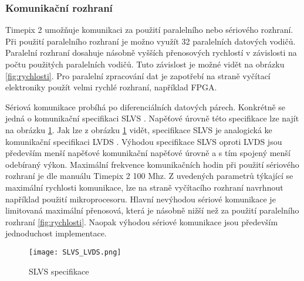 \subsubsection{Komunikační rozhraní}
\label{Komunikacni rozhrani}
Timepix 2 umožňuje komunikaci za použití paralelního nebo sériového rozhraní. Při použití paralelního rozhraní je možno využít 32 paralelních datových vodičů. Paralelní rozhraní dosahuje násobně vyšších přenosových rychlostí v závislosti na počtu použitých paralelních vodičů. Tuto závislost je možné vidět na obrázku \ref{fig:rychlosti}. Pro paralelní zpracování dat je zapotřebí na straně vyčítací elektroniky použít velmi rychlé rozhraní, například FPGA.  
\par Sériová komunikace probíhá po diferenciálních datových párech. Konkrétně se jedná o komunikační specifikaci SLVS \cite{SLVS}. Napěťové úrovně této specifikace lze najít na obrázku \ref{fig:SLVS_LVDS}. Jak lze z obrázku \ref{fig:SLVS_LVDS} vidět, specifikace SLVS je analogická ke komunikační specifikaci LVDS \cite{LVDS}. Výhodou specifikace SLVS oproti LVDS jsou především menší napěťové komunikační napěťové úrovně a s tím spojený menší odebíraný výkon. Maximální frekvence komunikačních hodin při použití sériového rozhraní je dle manuálu Timepix 2 \cite{tpx2_manual} 100 Mhz. Z uvedených parametrů týkající se maximální rychlosti komunikace, lze na straně vyčítacího rozhraní navrhnout například použití mikroprocesoru. Hlavní nevýhodou sériové komunikace je limitovaná maximální přenosová, která je násobně nižší než za použití paralelního rozhraní \ref{fig:rychlosti}. Naopak výhodou sériové komunikace jsou především jednoduchost implementace.
\begin{figure}[h!]
	\centering
	\captionsetup{justification=centering}
	\texttt{[image: SLVS\_LVDS.png]}
	\caption{SLVS specifikace \cite{SLVS}} 
	\label{fig:SLVS_LVDS}
\end{figure}	

